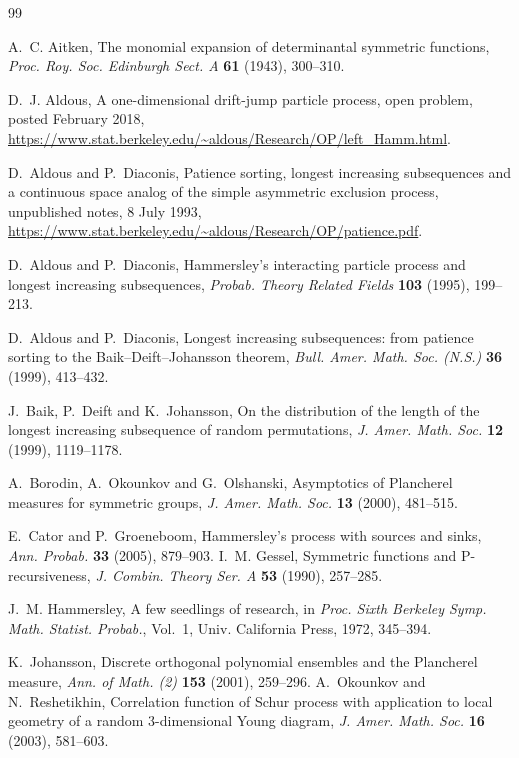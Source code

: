 \documentclass[11pt]{amsart}
\theoremstyle{remark}
\numberwithin{equation}{section}
\begin{document}
\begin{thebibliography}{99}

A.~C. Aitken, The monomial expansion of determinantal symmetric functions, \emph{Proc. Roy. Soc. Edinburgh Sect. A} \textbf{61} (1943), 300--310.

D.~J. Aldous, A one-dimensional drift-jump particle process, open problem, posted February 2018, \url{https://www.stat.berkeley.edu/~aldous/Research/OP/left_Hamm.html}.

D.~Aldous and P.~Diaconis, Patience sorting, longest increasing subsequences and a continuous space analog of the simple asymmetric exclusion process, unpublished notes, 8 July 1993, \url{https://www.stat.berkeley.edu/~aldous/Research/OP/patience.pdf}.

D.~Aldous and P.~Diaconis, Hammersley's interacting particle process and longest increasing subsequences, \emph{Probab. Theory Related Fields} \textbf{103} (1995), 199--213.

D.~Aldous and P.~Diaconis, Longest increasing subsequences: from patience sorting to the Baik--Deift--Johansson theorem, \emph{Bull. Amer. Math. Soc. (N.S.)} \textbf{36} (1999), 413--432.

J.~Baik, P.~Deift and K.~Johansson, On the distribution of the length of the longest increasing subsequence of random permutations, \emph{J. Amer. Math. Soc.} \textbf{12} (1999), 1119--1178.

A.~Borodin, A.~Okounkov and G.~Olshanski, Asymptotics of Plancherel measures for symmetric groups, \emph{J. Amer. Math. Soc.} \textbf{13} (2000), 481--515.

E.~Cator and P.~Groeneboom, Hammersley's process with sources and sinks, \emph{Ann. Probab.} \textbf{33} (2005), 879--903.
I.~M. Gessel, Symmetric functions and P-recursiveness, \emph{J. Combin. Theory Ser. A} \textbf{53} (1990), 257--285.

J.~M. Hammersley, A few seedlings of research, in \emph{Proc. Sixth Berkeley Symp. Math. Statist. Probab.}, Vol.~1, Univ. California Press, 1972, 345--394.

K.~Johansson, Discrete orthogonal polynomial ensembles and the Plancherel measure, \emph{Ann. of Math. (2)} \textbf{153} (2001), 259--296.
A.~Okounkov and N.~Reshetikhin, Correlation function of Schur process with application to local geometry of a random 3-dimensional Young diagram, \emph{J. Amer. Math. Soc.} \textbf{16} (2003), 581--603.


\end{thebibliography}
\end{document}
